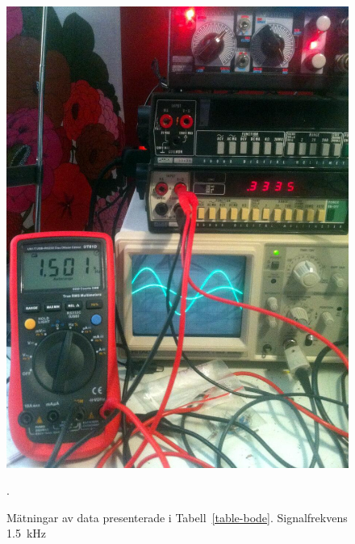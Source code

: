\begin{figure}
  \centering
  \includegraphics[width=\linewidth]{img/bode_1500Hz.jpg}
  \caption[] {Mätningar av data presenterade i Tabell~\ref{table-bode}.
              Signalfrekvens \SI{1.5}{\kHz}}.
  \label{fig:bode-foto-1500}
\end{figure}

